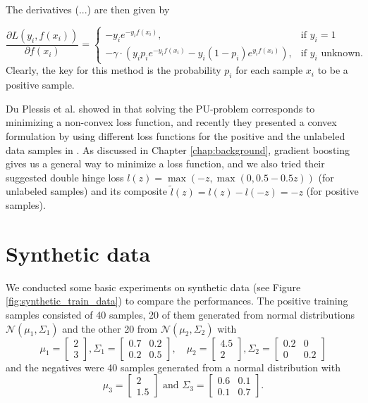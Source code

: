 The derivatives (...)  are then given by 

\begin{equation*}
 \frac{\partial L(y_i,f(x_i))}{\partial f(x_i)} = 
    \begin{cases}
	-y_i e^{-y_i f(x_i)}, & \text{if $y_i = 1$}\\
	-\gamma \cdot \left(y_i p_i e^{-y_i f(x_i)} - y_i (1 - p_i) e^{y_i f(x_i)} \right), & \text{if $y_i$ unknown.}
      \end{cases}
\end{equation*}
Clearly, the key for this method is the probability $p_i$ for each sample $x_i$ to be a positive sample. 

Du Plessis et al. showed in \cite{plessis2014PUanalysis} that solving the PU-problem corresponds to minimizing a non-convex loss function, and recently they presented a convex formulation by using different loss functions for the positive and the unlabeled data samples in \cite{plessis2015convex}. As discussed in Chapter \ref{chap:background}, gradient boosting gives us a general way to minimize a loss function, and we also tried their suggested double hinge loss $l(z) = \max(-z,\max(0,0.5 - 0.5 z))$ (for unlabeled samples) and its composite $\tilde l(z) = l(z) - l(-z) = -z$ (for positive samples). 

\section{Synthetic data}
We conducted some basic experiments on synthetic data (see Figure \ref{fig:synthetic_train_data}) to compare the performances. The positive training samples consisted of 40 samples, 20 of them generated from normal distributions $\mathcal{N}(\mu_1,\Sigma_1)$ and the other 20 from $\mathcal{N}(\mu_2, \Sigma_2)$ with 
$$\mu_1= \begin{bmatrix}2 \\ 3 \end{bmatrix}, \Sigma_1 = \begin{bmatrix}0.7 & 0.2 \\ 0.2 & 0.5 \end{bmatrix}, \quad \mu_2 = \begin{bmatrix}4.5 \\ 2 \end{bmatrix}, \Sigma_2 = \begin{bmatrix} 0.2 & 0 \\ 0 & 0.2 \end{bmatrix}$$
and the negatives were 40 samples generated from a normal distribution with 
$$\mu_3 = \begin{bmatrix} 2\\1.5\end{bmatrix} \text{ and } \Sigma_3 = \begin{bmatrix}0.6 & 0.1\\ 0.1 & 0.7\end{bmatrix}.$$

